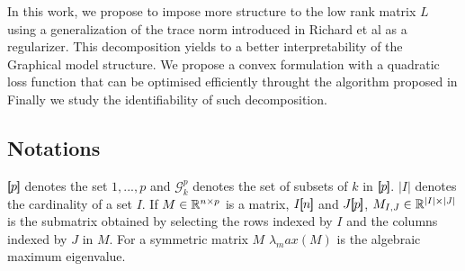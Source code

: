 In this work, we propose to impose more structure to the low rank matrix $L$ using a generalization of the trace norm introduced in Richard et al as a regularizer. This decomposition yields to a better interpretability of the Graphical model structure. We propose a convex formulation with a quadratic loss function that can be optimised efficiently throught the algorithm proposed in \citet{vinyes2017}  Finally we study the identifiability of such decomposition. 

\subsection*{Notations}
$[\!\![p]\!\!]$ denotes the set ${1,...,p}$ and $\mathcal{G}^p_k$ denotes the
set of subsets of $k$ in $[\!\![p]\!\!]$. $|I|$ denotes the cardinality of a set $I$. If $M\in\mathbb{R}^{n\times p}$ is a matrix, $I[\!\![n]\!\!]$ and $J[\!\![p]\!\!]$, $M_{I,J}\in\mathbb{R}^{|I|\times |J|}$ is the submatrix obtained by selecting the rows indexed by $I$ and the columns indexed by $J$ in $M$. For a symmetric matrix $M$ $\lambda_max(M)$ is the algebraic maximum eigenvalue.

%
